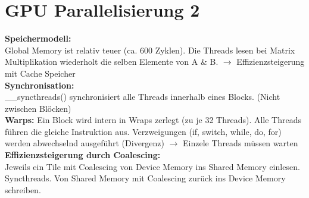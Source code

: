 
\section{GPU Parallelisierung 2}
\textcolor{b}{\textbf{Speichermodell:}}\\
Global Memory ist relativ teuer (ca. 600 Zyklen). Die Threads lesen bei Matrix Multiplikation wiederholt die selben Elemente von A \& B. $\rightarrow$ Effizienzsteigerung mit Cache Speicher\\
\textcolor{b}{\textbf{Synchronisation:}}\\
\textcolor{b}{\_\_syncthreads()} synchronisiert alle Threads innerhalb eines Blocks. (Nicht zwischen Blöcken)\\
\textcolor{b}{\textbf{Warps:}} Ein Block wird intern in Wraps zerlegt (zu je 32 Threads). Alle Threads führen die gleiche Instruktion aus. Verzweigungen (if, switch, while, do, for) werden abwechselnd ausgeführt (Divergenz) $\rightarrow$ Einzele Threads müssen warten\\
\textcolor{b}{\textbf{Effizienzsteigerung durch Coalescing:}}\\
Jeweils ein Tile mit Coalescing von Device Memory ins Shared Memory einlesen. Syncthreads. Von Shared Memory mit Coalescing zurück ins Device Memory schreiben.
